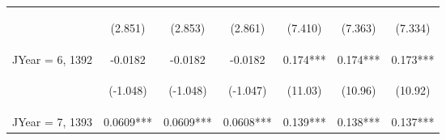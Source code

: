 \documentclass{standalone}
\begin{document}
\begin{tabular}{lcccccc}
    \vspace{4pt}     & \begin{footnotesize}(2.851)\end{footnotesize}   & \begin{footnotesize}(2.853)\end{footnotesize}   & \begin{footnotesize}(2.861)\end{footnotesize}   & \begin{footnotesize}(7.410)\end{footnotesize}  & \begin{footnotesize}(7.363)\end{footnotesize}  & \begin{footnotesize}(7.334)\end{footnotesize}  \\
    JYear = 6, 1392  & -0.0182                                         & -0.0182                                         & -0.0182                                         & 0.174***                                       & 0.174***                                       & 0.173***                                       \\
    \vspace{4pt}     & \begin{footnotesize}(-1.048)\end{footnotesize}  & \begin{footnotesize}(-1.048)\end{footnotesize}  & \begin{footnotesize}(-1.047)\end{footnotesize}  & \begin{footnotesize}(11.03)\end{footnotesize}  & \begin{footnotesize}(10.96)\end{footnotesize}  & \begin{footnotesize}(10.92)\end{footnotesize}  \\
    JYear = 7, 1393  & 0.0609***                                       & 0.0609***                                       & 0.0608***                                       & 0.139***                                       & 0.138***                                       & 0.137***                                       \\

\end{tabular}
\end{document}
